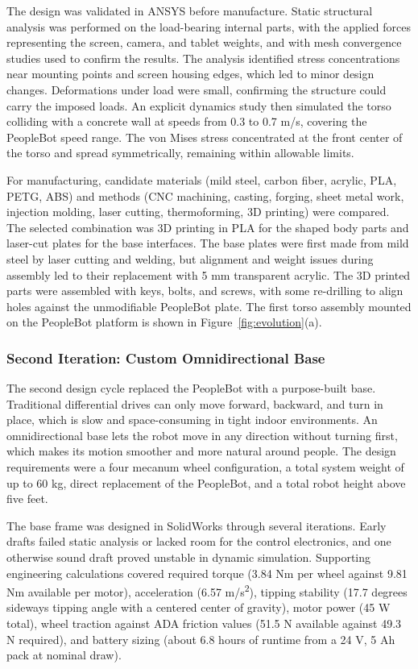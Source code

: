 \documentclass[11pt,a4paper]{article}
\begin{document}
The design was validated in ANSYS before manufacture. Static structural analysis was performed on the load-bearing internal parts, with the applied forces representing the screen, camera, and tablet weights, and with mesh convergence studies used to confirm the results. The analysis identified stress concentrations near mounting points and screen housing edges, which led to minor design changes. Deformations under load were small, confirming the structure could carry the imposed loads. An explicit dynamics study then simulated the torso colliding with a concrete wall at speeds from 0.3 to 0.7 m/s, covering the PeopleBot speed range. The von Mises stress concentrated at the front center of the torso and spread symmetrically, remaining within allowable limits.

For manufacturing, candidate materials (mild steel, carbon fiber, acrylic, PLA, PETG, ABS) and methods (CNC machining, casting, forging, sheet metal work, injection molding, laser cutting, thermoforming, 3D printing) were compared. The selected combination was 3D printing in PLA for the shaped body parts and laser-cut plates for the base interfaces. The base plates were first made from mild steel by laser cutting and welding, but alignment and weight issues during assembly led to their replacement with 5 mm transparent acrylic. The 3D printed parts were assembled with keys, bolts, and screws, with some re-drilling to align holes against the unmodifiable PeopleBot plate. The first torso assembly mounted on the PeopleBot platform is shown in Figure~\ref{fig:evolution}(a).

\subsubsection{Second Iteration: Custom Omnidirectional Base}

The second design cycle replaced the PeopleBot with a purpose-built base. Traditional differential drives can only move forward, backward, and turn in place, which is slow and space-consuming in tight indoor environments. An omnidirectional base lets the robot move in any direction without turning first, which makes its motion smoother and more natural around people. The design requirements were a four mecanum wheel configuration, a total system weight of up to 60 kg, direct replacement of the PeopleBot, and a total robot height above five feet.

The base frame was designed in SolidWorks through several iterations. Early drafts failed static analysis or lacked room for the control electronics, and one otherwise sound draft proved unstable in dynamic simulation. Supporting engineering calculations covered required torque (3.84 Nm per wheel against 9.81 Nm available per motor), acceleration (6.57 m/s\textsuperscript{2}), tipping stability (17.7 degrees sideways tipping angle with a centered center of gravity), motor power (45 W total), wheel traction against ADA friction values (51.5 N available against 49.3 N required), and battery sizing (about 6.8 hours of runtime from a 24 V, 5 Ah pack at nominal draw).
\end{document}
